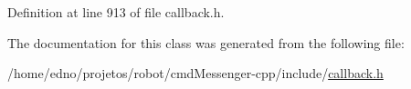 Definition at line 913 of file callback.\+h.



The documentation for this class was generated from the following file\+:\begin{DoxyCompactItemize}
\item 
/home/edno/projetos/robot/cmd\+Messenger-\/cpp/include/\hyperlink{callback_8h}{callback.\+h}\end{DoxyCompactItemize}

